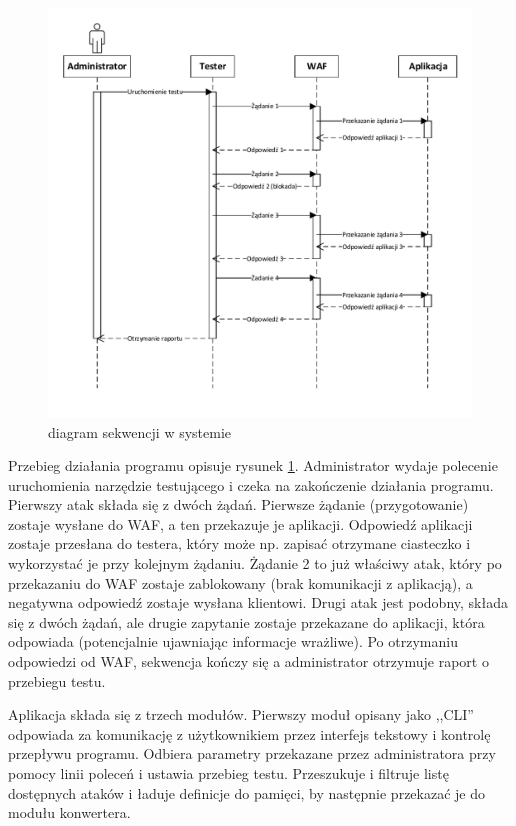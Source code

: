 \documentclass[11pt,a4paper,polish,thesis]{dcsbook}
\begin{document}
\begin{figure}
\centering
\centerline{\includegraphics{schemat.pdf}}
\caption{diagram sekwencji w systemie}
\label{fig:przeplyw}
\end{figure}


Przebieg działania programu opisuje rysunek \ref{fig:przeplyw}. Administrator wydaje polecenie uruchomienia narzędzie testującego i czeka na zakończenie działania programu. Pierwszy atak składa się z dwóch żądań. Pierwsze żądanie (przygotowanie) zostaje wysłane do WAF, a ten przekazuje je aplikacji. Odpowiedź aplikacji zostaje przesłana do testera, który może np. zapisać otrzymane ciasteczko i wykorzystać je przy kolejnym żądaniu. Żądanie 2 to już właściwy atak, który po przekazaniu do WAF zostaje zablokowany (brak komunikacji z aplikacją), a negatywna odpowiedź zostaje wysłana klientowi. Drugi atak jest podobny, składa się z dwóch żądań, ale drugie zapytanie zostaje przekazane do aplikacji, która odpowiada (potencjalnie ujawniając informacje wrażliwe). Po otrzymaniu odpowiedzi od WAF, sekwencja kończy się a administrator otrzymuje raport o przebiegu testu.

Aplikacja składa się z trzech modułów. Pierwszy moduł opisany jako ,,CLI'' odpowiada za komunikację z użytkownikiem przez interfejs tekstowy i kontrolę przepływu programu. Odbiera parametry przekazane przez administratora przy pomocy linii poleceń i ustawia przebieg testu. Przeszukuje i filtruje listę dostępnych ataków i ładuje definicje do pamięci, by następnie przekazać je do modułu konwertera.
\end{document}
